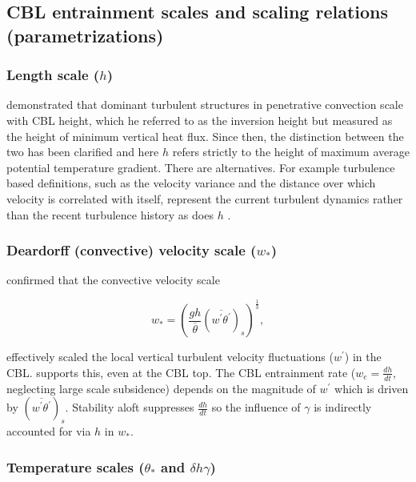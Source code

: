 \subsection{CBL entrainment scales and scaling relations (parametrizations)}
\label{subsec:scales}
\subsubsection{Length scale ($h$)}
\label{subsubsec:}

\cite{Deardorff72} demonstrated that dominant turbulent structures in penetrative convection scale with CBL height, which he referred to as the inversion height but measured as the height of minimum vertical heat flux.  Since then, the distinction between the two has been clarified \citep{SullMoengStev} and here $h$ refers strictly to the height of maximum average potential temperature gradient. There are alternatives. For example turbulence based definitions, such as the velocity variance and the distance over which velocity is correlated with itself, represent the current turbulent dynamics rather than the recent turbulence history as does $h$ \citep{Traum11}.\\

\subsubsection{Deardorff (convective) velocity scale ($w_{*}$)}
\label{subsubsec:convel}

\cite{Deardorff70} confirmed that the convective velocity scale

\begin{equation}
w_{*} = \left( \frac{gh}{\overline{\theta}}(\overline{w^{'}\theta^{'}})_{s} \right)^{\frac{1}{3}},
\end{equation}


 effectively scaled the local vertical turbulent velocity fluctuations ($w^{'}$) in the CBL.  \cite{Sorbjan1} supports this, even at the CBL top.  The CBL entrainment rate ($w_{e} = \frac{dh}{dt}$, neglecting large scale subsidence) depends on the magnitude of $w^{'}$ which is driven by $(\overline{w^{'}\theta^{'}})_{s}$. Stability aloft suppresses $\frac{dh}{dt}$ so the influence of $\gamma$ is indirectly accounted for via $h$ in $w_{*}$.\\

\subsubsection{Temperature scales ($\theta_{*}$ and $\delta h \gamma$)}
\label{subsubsec:tempscales}

